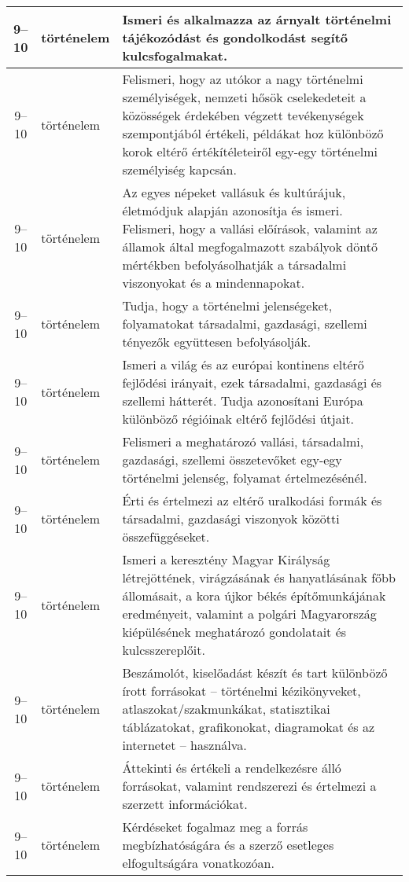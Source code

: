 \begin{small}
\begin{longtable}{c | p{2cm} |  p{11cm} }
              9--10 & történelem & Ismeri és alkalmazza az árnyalt történelmi tájékozódást és gondolkodást segítő kulcsfogalmakat. \\ \hline
              9--10 & történelem & Felismeri, hogy az utókor a nagy történelmi személyiségek, nemzeti hősök cselekedeteit a közösségek érdekében végzett tevékenységek szempontjából értékeli, példákat hoz különböző korok eltérő értékítéleteiről egy-egy történelmi személyiség kapcsán. \\ \hline
              9--10 & történelem & Az egyes népeket vallásuk és kultúrájuk, életmódjuk alapján azonosítja és ismeri. Felismeri, hogy a vallási előírások, valamint az államok által megfogalmazott szabályok döntő mértékben befolyásolhatják a társadalmi viszonyokat és a mindennapokat. \\ \hline
              9--10 & történelem & Tudja, hogy a történelmi jelenségeket, folyamatokat társadalmi, gazdasági, szellemi tényezők együttesen befolyásolják. \\ \hline
              9--10 & történelem & Ismeri a világ és az európai kontinens eltérő fejlődési irányait, ezek társadalmi, gazdasági és szellemi hátterét. Tudja azonosítani Európa különböző régióinak eltérő fejlődési útjait. \\ \hline
              9--10 & történelem & Felismeri a meghatározó vallási, társadalmi, gazdasági, szellemi összetevőket egy-egy történelmi jelenség, folyamat értelmezésénél. \\ \hline
              9--10 & történelem & Érti és értelmezi az eltérő uralkodási formák és társadalmi, gazdasági viszonyok közötti összefüggéseket. \\ \hline
              9--10 & történelem & Ismeri a keresztény Magyar Királyság létrejöttének, virágzásának és hanyatlásának főbb állomásait, a kora újkor békés építőmunkájának eredményeit, valamint a polgári Magyarország kiépülésének meghatározó gondolatait és kulcsszereplőit. \\ \hline
              9--10 & történelem & Beszámolót, kiselőadást készít és tart különböző írott forrásokat -- történelmi kézikönyveket, atlaszokat/szakmunkákat, statisztikai táblázatokat, grafikonokat, diagramokat és az internetet -- használva. \\ \hline
              9--10 & történelem & Áttekinti és értékeli a rendelkezésre álló forrásokat, valamint rendszerezi és értelmezi a szerzett információkat. \\ \hline
              9--10 & történelem & Kérdéseket fogalmaz meg a forrás megbízhatóságára és a szerző esetleges elfogultságára vonatkozóan. \\ \hline

\end{longtable}
\end{small}

